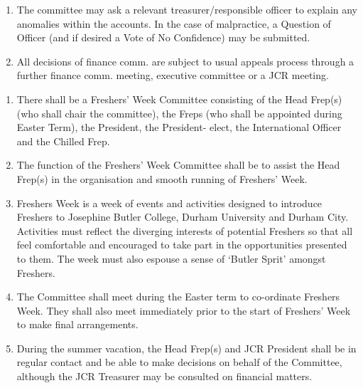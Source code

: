 \begin{enumerate}
    \label{it:Fundraising}
    \item The committee may ask a relevant treasurer/responsible officer to explain any anomalies within the accounts. In the case of malpractice, a Question of Officer (and if desired a Vote of No Confidence) may be submitted.
    \item All decisions of finance comm. are subject to usual appeals process through a further finance comm. meeting, executive committee or a JCR meeting.
\end{enumerate}



\begin{enumerate}
    \item There shall be a Freshers’ Week Committee consisting of the Head Frep(s) (who shall chair the committee), the Freps (who shall be appointed during Easter Term), the President, the President- elect, the International Officer and the Chilled Frep.
    \item The function of the Freshers’ Week Committee shall be to assist the Head Frep(s) in the organisation and smooth running of Freshers’ Week.
    \item Freshers Week is a week of events and activities designed to introduce Freshers to Josephine Butler College, Durham University and Durham City. Activities must reflect the diverging interests of potential Freshers so that all feel comfortable and encouraged to take part in the opportunities presented to them. The week must also espouse a sense of ‘Butler Sprit’ amongst Freshers.
    \item The Committee shall meet during the Easter term to co-ordinate Freshers Week. They shall also meet immediately prior to the start of Freshers’ Week to make final arrangements.
    \item During the summer vacation, the Head Frep(s) and JCR President shall be in regular contact and be able to make decisions on behalf of the Committee, although the JCR Treasurer may be consulted on financial matters.
\end{enumerate}



